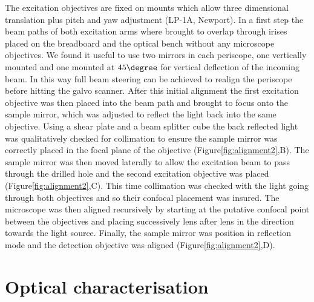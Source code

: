 \documentclass[12pt]{spieman}  %
\begin{document}
The excitation objectives are fixed on mounts which allow three dimensional translation plus pitch and yaw adjustment (LP-1A, Newport). In a first step the beam paths of both excitation arms where brought to overlap through irises placed on the breadboard and the optical bench without any microscope objectives. We found it useful to use two mirrors in each periscope, one vertically mounted and one mounted at $45\degree$ for vertical deflection of the incoming beam. In this way full beam steering can be achieved to realign the periscope before hitting the galvo scanner. After this initial alignment the first excitation objective was then placed into the beam path and brought to focus onto the sample mirror, which was adjusted to reflect the light back into the same objective. Using a shear plate and a beam splitter cube the back reflected light was qualitatively checked for collimation to ensure the sample mirror was correctly placed in the focal plane of the objective (Figure\ref{fig:alignment2},B). The sample mirror was then moved laterally to allow the excitation beam to pass through the drilled hole and the second excitation objective was placed (Figure\ref{fig:alignment2},C). This time collimation was checked with the light going through both objectives and so their confocal placement was insured. The microscope was then aligned recursively by starting at the putative confocal point between the objectives and placing successively lens after lens in the direction towards the light source. Finally, the sample mirror was position in reflection mode and the detection objective was aligned (Figure\ref{fig:alignment2},D). 

\section{Optical characterisation}
	
\end{document}

